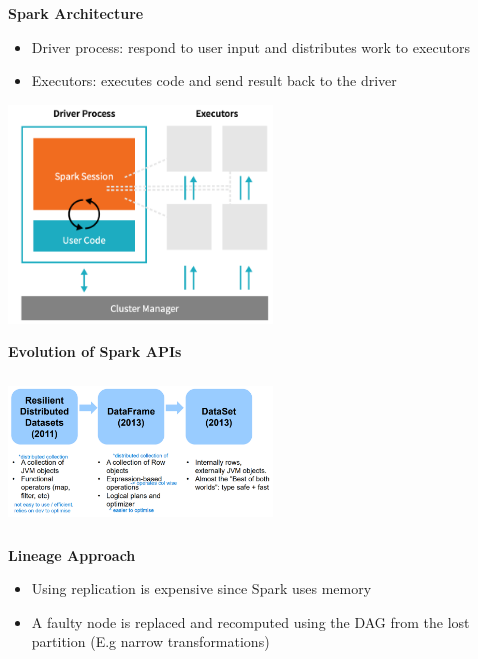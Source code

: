 \documentclass[10pt, landscape]{article}
\begin{document}
\begin{multicols}{4}
\textbf{Spark Architecture}
\begin{itemize}
  \item Driver process: respond to user input and distributes work to executors
  \item Executors: executes code and send result back to the driver
\end{itemize}

\includegraphics*[width=7cm]{spark_arch}

\textbf{Evolution of Spark APIs}

\includegraphics*[width=7cm, height=4cm]{spark_evo}


\textbf{Lineage Approach}
\begin{itemize}
  \item Using replication is expensive since Spark uses memory
  \item A faulty node is replaced and recomputed using the DAG from the lost partition (E.g narrow transformations)
\end{itemize}


\end{multicols}
\end{document}
